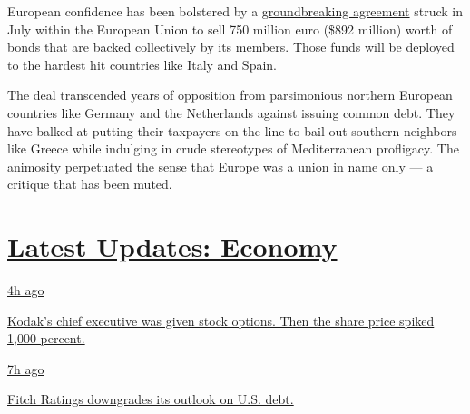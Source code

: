 European confidence has been bolstered by a
\href{https://www.nytimes3xbfgragh.onion/2020/07/20/world/europe/eu-stimulus-coronavirus.html}{groundbreaking
agreement} struck in July within the European Union to sell 750 million
euro (\$892 million) worth of bonds that are backed collectively by its
members. Those funds will be deployed to the hardest hit countries like
Italy and Spain.

The deal transcended years of opposition from parsimonious northern
European countries like Germany and the Netherlands against issuing
common debt. They have balked at putting their taxpayers on the line to
bail out southern neighbors like Greece while indulging in crude
stereotypes of Mediterranean profligacy. The animosity perpetuated the
sense that Europe was a union in name only --- a critique that has been
muted.

\hypertarget{latest-updates-economy}{%
\section{\texorpdfstring{\href{https://www.nytimes3xbfgragh.onion/live/2020/07/31/business/stock-market-today-coronavirus?action=click\&pgtype=Article\&state=default\&region=MAIN_CONTENT_1\&context=storylines_live_updates}{Latest
Updates:
Economy}}{Latest Updates: Economy}}\label{latest-updates-economy}}

\href{https://www.nytimes3xbfgragh.onion/live/2020/07/31/business/stock-market-today-coronavirus?action=click\&pgtype=Article\&state=default\&region=MAIN_CONTENT_1\&context=storylines_live_updates\#kodaks-chief-executive-was-given-stock-options-then-the-share-price-spiked-1000-percent}{4h
ago}

\href{https://www.nytimes3xbfgragh.onion/live/2020/07/31/business/stock-market-today-coronavirus?action=click\&pgtype=Article\&state=default\&region=MAIN_CONTENT_1\&context=storylines_live_updates\#kodaks-chief-executive-was-given-stock-options-then-the-share-price-spiked-1000-percent}{Kodak's
chief executive was given stock options. Then the share price spiked
1,000 percent.}

\href{https://www.nytimes3xbfgragh.onion/live/2020/07/31/business/stock-market-today-coronavirus?action=click\&pgtype=Article\&state=default\&region=MAIN_CONTENT_1\&context=storylines_live_updates\#fitch-ratings-downgrades-its-outlook-on-us-debt}{7h
ago}

\href{https://www.nytimes3xbfgragh.onion/live/2020/07/31/business/stock-market-today-coronavirus?action=click\&pgtype=Article\&state=default\&region=MAIN_CONTENT_1\&context=storylines_live_updates\#fitch-ratings-downgrades-its-outlook-on-us-debt}{Fitch
Ratings downgrades its outlook on U.S. debt.}

